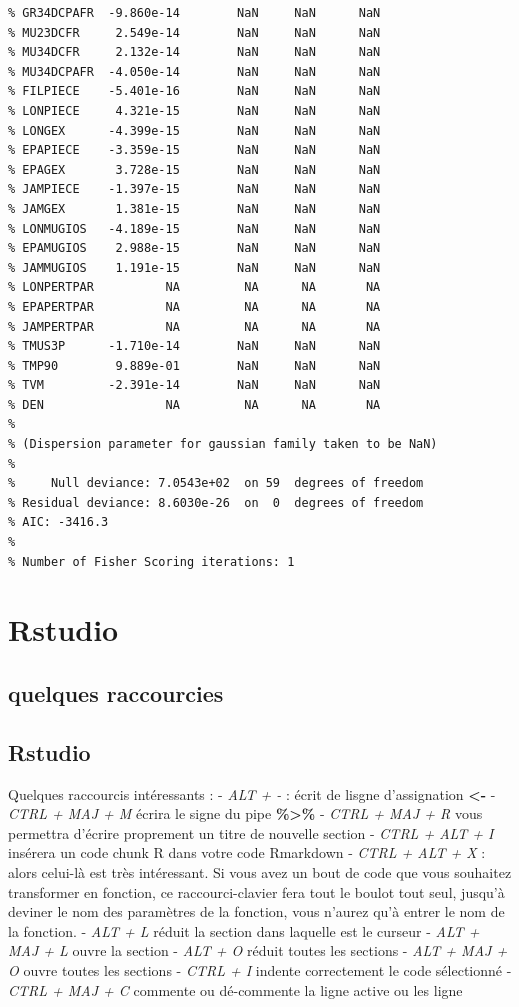 \documentclass[
]{article}
\begin{document}
\begin{verbatim}
% GR34DCPAFR  -9.860e-14        NaN     NaN      NaN
% MU23DCFR     2.549e-14        NaN     NaN      NaN
% MU34DCFR     2.132e-14        NaN     NaN      NaN
% MU34DCPAFR  -4.050e-14        NaN     NaN      NaN
% FILPIECE    -5.401e-16        NaN     NaN      NaN
% LONPIECE     4.321e-15        NaN     NaN      NaN
% LONGEX      -4.399e-15        NaN     NaN      NaN
% EPAPIECE    -3.359e-15        NaN     NaN      NaN
% EPAGEX       3.728e-15        NaN     NaN      NaN
% JAMPIECE    -1.397e-15        NaN     NaN      NaN
% JAMGEX       1.381e-15        NaN     NaN      NaN
% LONMUGIOS   -4.189e-15        NaN     NaN      NaN
% EPAMUGIOS    2.988e-15        NaN     NaN      NaN
% JAMMUGIOS    1.191e-15        NaN     NaN      NaN
% LONPERTPAR          NA         NA      NA       NA
% EPAPERTPAR          NA         NA      NA       NA
% JAMPERTPAR          NA         NA      NA       NA
% TMUS3P      -1.710e-14        NaN     NaN      NaN
% TMP90        9.889e-01        NaN     NaN      NaN
% TVM         -2.391e-14        NaN     NaN      NaN
% DEN                 NA         NA      NA       NA
% 
% (Dispersion parameter for gaussian family taken to be NaN)
% 
%     Null deviance: 7.0543e+02  on 59  degrees of freedom
% Residual deviance: 8.6030e-26  on  0  degrees of freedom
% AIC: -3416.3
% 
% Number of Fisher Scoring iterations: 1
\end{verbatim}

\hypertarget{rstudio}{%
\section{Rstudio}\label{rstudio}}

\hypertarget{quelques-raccourcies}{%
\subsection{quelques raccourcies}\label{quelques-raccourcies}}

\hypertarget{rstudio-1}{%
\subsection{Rstudio}\label{rstudio-1}}

Quelques raccourcis intéressants : - \emph{ALT + -} : écrit de lisgne
d'assignation \textbf{\textless-} - \emph{CTRL + MAJ + M} écrira le
signe du pipe \textbf{\%\textgreater\%} - \emph{CTRL + MAJ + R} vous
permettra d'écrire proprement un titre de nouvelle section - \emph{CTRL
+ ALT + I} insérera un code chunk R dans votre code Rmarkdown -
\emph{CTRL + ALT + X} : alors celui-là est très intéressant. Si vous
avez un bout de code que vous souhaitez transformer en fonction, ce
raccourci-clavier fera tout le boulot tout seul, jusqu'à deviner le nom
des paramètres de la fonction, vous n'aurez qu'à entrer le nom de la
fonction. - \emph{ALT + L} réduit la section dans laquelle est le
curseur - \emph{ALT + MAJ + L} ouvre la section - \emph{ALT + O} réduit
toutes les sections - \emph{ALT + MAJ + O} ouvre toutes les sections -
\emph{CTRL + I} indente correctement le code sélectionné - \emph{CTRL +
MAJ + C} commente ou dé-commente la ligne active ou les ligne
\end{document}
